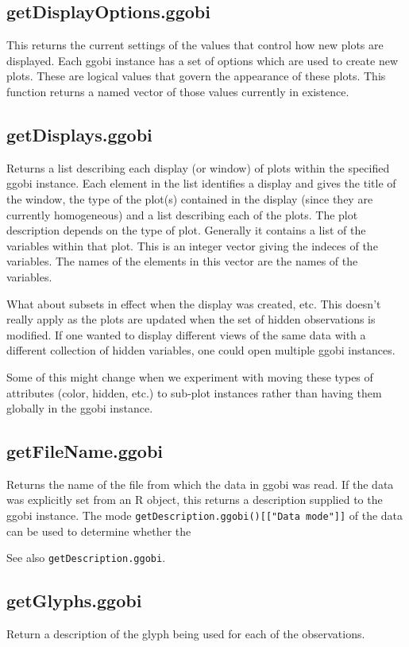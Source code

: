 \documentclass{article}
\def\SFunction#1{{\texttt{\red #1}}}
\begin{document}
\subsection{getDisplayOptions.ggobi}
This returns the current settings of the values that control how new
plots are displayed.  Each ggobi instance has a set of options which
are used to create new plots.  These are logical values that govern
the appearance of these plots.  This function returns a named vector
of those values currently in existence.

\subsection{getDisplays.ggobi}
Returns a list describing each display (or window) of plots within the
specified ggobi instance.  Each element in the list identifies a
display and gives the title of the window, the type of the plot(s)
contained in the display (since they are currently homogeneous) and a
list describing each of the plots.  The plot description depends on
the type of plot. Generally it contains a list of the variables within
that plot.  This is an integer vector giving the indeces of the
variables. The names of the elements in this vector are the names of
the variables. 

What about subsets in effect when the display was created, etc.  This
doesn't really apply as the plots are updated when the set of hidden
observations is modified.  If one wanted to display different views of
the same data with a different collection of hidden variables, one
could open multiple ggobi instances.

Some of this might change when we experiment with moving these types
of attributes (color, hidden, etc.) to sub-plot instances rather than
having them globally in the ggobi instance.

\subsection{getFileName.ggobi}
Returns the name of the file from which the data in ggobi was read. If
the data was explicitly set from an R object, this returns a
description supplied to the ggobi instance. The mode
\SFunction{getDescription.ggobi()[["Data mode"]]} of the data can be
used to determine whether the

See also \SFunction{getDescription.ggobi}.

\subsection{getGlyphs.ggobi}
Return a description of the glyph
being used for each of the observations.
\end{document}
